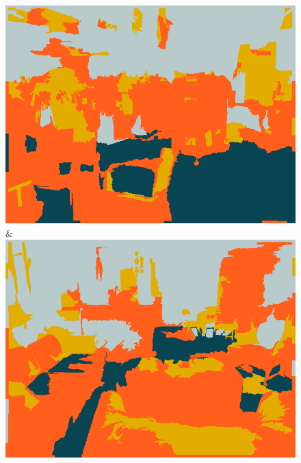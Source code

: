 \begin{figure}
\begin{tabu}
    \includegraphics[width=\linewidth]{nyu/images/00118_svm.png}&%
    \includegraphics[width=\linewidth]{nyu/images/01203_svm.png}\\
    \vspace{3mm}\\


\end{tabu}
\end{figure}
